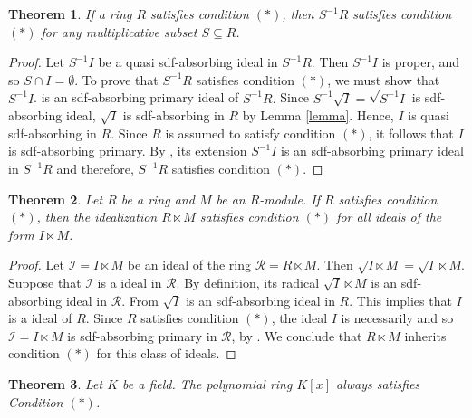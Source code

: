 \documentclass{amsart}%
\newtheorem{theorem}{Theorem}[section]
\begin{document}
\begin{theorem}
If a ring $R$ satisfies condition $(*)$, then $S^{-1}R$ satisfies condition
$(*)$ for any multiplicative subset $S \subseteq R$.
\end{theorem}

\begin{proof}
Let $S^{-1}I$ be a quasi sdf-absorbing ideal in $S^{-1}R$. Then $S^{-1}I$ is
proper, and so $S\cap I=\emptyset.$ To prove that $S^{-1}R$ satisfies
condition $(\ast)$, we must show that $S^{-1}I$. is an sdf-absorbing primary
ideal of $S^{-1}R.$ Since $S^{-1}\sqrt{I}=\sqrt{S^{-1}I}$ is sdf-absorbing
ideal, $\sqrt{I}$ is sdf-absorbing in $R$ by Lemma \ref{lemma}. Hence, $I$ is
quasi sdf-absorbing in $R$. Since $R$ is assumed to satisfy condition $(\ast
)$, it follows that $I$ is sdf-absorbing primary. By \cite[Proposition 3
(1)]{KhashanCelikel}, its extension $S^{-1}I$ is an sdf-absorbing primary
ideal in $S^{-1}R$ and therefore, $S^{-1}R$ satisfies condition $(\ast).$
\end{proof}

\begin{theorem}
Let $R$ be a ring and $M$ be an $R$-module. If $R$ satisfies condition
$(\ast)$, then the idealization $R \ltimes M$ satisfies condition $(\ast)$ for
all ideals of the form $I \ltimes M$.
\end{theorem}

\begin{proof}
Let $\mathcal{I} = I \ltimes M$ be an ideal of the ring $\mathcal{R} = R
\ltimes M$. Then $\sqrt{I \ltimes M} = \sqrt{I} \ltimes M$. Suppose that
$\mathcal{I}$ is a  ideal in $\mathcal{R}$. By
definition, its radical $\sqrt{I} \ltimes M$ is an sdf-absorbing ideal in
$\mathcal{R}$. From \cite[Theorem 4.19]{AB2024} $\sqrt{I}$ is an sdf-absorbing
ideal in $R$. This implies that $I$ is a  ideal of
$R$. Since $R$ satisfies condition $(\ast)$, the ideal $I$ is necessarily
 and so $\mathcal{I} = I \ltimes M$ is
sdf-absorbing primary in $\mathcal{R}$, by \cite[Theorem 8 (1)]%
{KhashanCelikel}. We conclude that $R \ltimes M$ inherits condition $(\ast)$
for this class of ideals.
\end{proof}

\begin{theorem}
Let $K$ be a field. The polynomial ring $K[x]$ always satisfies Condition
$(\ast)$.
\end{theorem}
\end{document}
